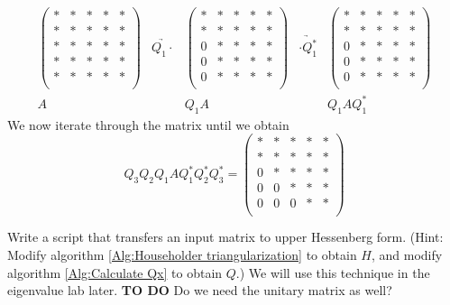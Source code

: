 \[
\begin{array}{ccccc} 
\begin{pmatrix}
* & * & * & * & *\\
* & * & * & * & *\\
* & * & * & * & *\\
* & * & * & * & *\\
* & * & * & * & *\\
\end{pmatrix} 
&\underrightarrow{Q_1 \cdot }&
\begin{pmatrix}
* & * & * & * & *\\
* & * & * & * & *\\
0 & * & * & * & *\\
0 & * & * & * & *\\
0 & * & * & * & *\\
\end{pmatrix} 
&\underrightarrow{\cdot Q_1^* }&
\begin{pmatrix}
* & * & * & * & *\\
* & * & * & * & *\\
0 & * & * & * & *\\
0 & * & * & * & *\\
0 & * & * & * & *\\
\end{pmatrix} 
\\ 
A & & Q_1A & & Q_1 A Q_1^*
  \end{array}
\]
We now iterate through the matrix until we obtain
\begin{equation*}
Q_3 Q_2 Q_1 A Q_1^* Q_2 ^* Q_3^* = 
\begin{pmatrix}
* & * & * & * & *\\
* & * & * & * & *\\
0 & * & * & * & *\\
0 & 0 & * & * & *\\
0 & 0 & 0 & * & *\\
\end{pmatrix} 
\end{equation*}

\begin{problem}
Write a script that transfers an input matrix to upper Hessenberg form. (Hint: Modify algorithm \ref{Alg:Householder triangularization} to obtain $H$, and modify algorithm \ref{Alg:Calculate Qx} to obtain $Q$.) We will use this technique in the eigenvalue lab later. {\bf TO DO} Do we need the unitary matrix as well?
\end{problem}

